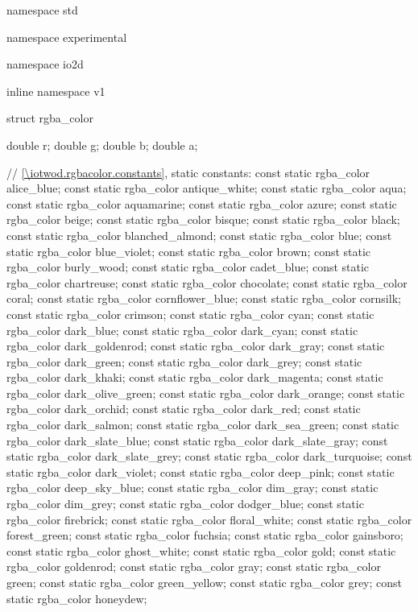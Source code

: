 \begin{codeblock}
namespace std { namespace experimental { namespace io2d { inline namespace v1 {
  struct rgba_color {
    double r;
    double g;
    double b;
    double a;
    
    // \ref{\iotwod.rgbacolor.constants}, static constants:
    const static rgba_color alice_blue;
    const static rgba_color antique_white;
    const static rgba_color aqua;
    const static rgba_color aquamarine;
    const static rgba_color azure;
    const static rgba_color beige;
    const static rgba_color bisque;
    const static rgba_color black;
    const static rgba_color blanched_almond;
    const static rgba_color blue;
    const static rgba_color blue_violet;
    const static rgba_color brown;
    const static rgba_color burly_wood;
    const static rgba_color cadet_blue;
    const static rgba_color chartreuse;
    const static rgba_color chocolate;
    const static rgba_color coral;
    const static rgba_color cornflower_blue;
    const static rgba_color cornsilk;
    const static rgba_color crimson;
    const static rgba_color cyan;
    const static rgba_color dark_blue;
    const static rgba_color dark_cyan;
    const static rgba_color dark_goldenrod;
    const static rgba_color dark_gray;
    const static rgba_color dark_green;
    const static rgba_color dark_grey;
    const static rgba_color dark_khaki;
    const static rgba_color dark_magenta;
    const static rgba_color dark_olive_green;
    const static rgba_color dark_orange;
    const static rgba_color dark_orchid;
    const static rgba_color dark_red;
    const static rgba_color dark_salmon;
    const static rgba_color dark_sea_green;
    const static rgba_color dark_slate_blue;
    const static rgba_color dark_slate_gray;
    const static rgba_color dark_slate_grey;
    const static rgba_color dark_turquoise;
    const static rgba_color dark_violet;
    const static rgba_color deep_pink;
    const static rgba_color deep_sky_blue;
    const static rgba_color dim_gray;
    const static rgba_color dim_grey;
    const static rgba_color dodger_blue;
    const static rgba_color firebrick;
    const static rgba_color floral_white;
    const static rgba_color forest_green;
    const static rgba_color fuchsia;
    const static rgba_color gainsboro;
    const static rgba_color ghost_white;
    const static rgba_color gold;
    const static rgba_color goldenrod;
    const static rgba_color gray;
    const static rgba_color green;
    const static rgba_color green_yellow;
    const static rgba_color grey;
    const static rgba_color honeydew;
}}}}}
\end{codeblock}
